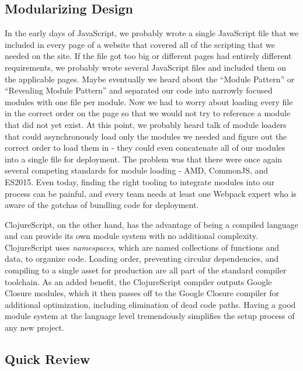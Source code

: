 \documentclass[10pt,twoside,openright]{memoir}
\begin{document}
\subsection{Modularizing Design}

In the early days of JavaScript, we probably wrote a single JavaScript
file that we included in every page of a website that covered all of the
scripting that we needed on the site. If the file got too big or
different pages had entirely different requirements, we probably wrote
several JavaScript files and included them on the applicable pages.
Maybe eventually we heard about the ``Module Pattern'' or ``Revealing
Module Pattern'' and separated our code into narrowly focused modules
with one file per module. Now we had to worry about loading every file
in the correct order on the page so that we would not try to reference a
module that did not yet exist. At this point, we probably heard talk of
module loaders that could asynchronously load only the modules we needed
and figure out the correct order to load them in - they could even
concatenate all of our modules into a single file for deployment. The
problem was that there were once again several competing standards for
module loading - AMD, CommonJS, and ES2015. Even today, finding the
right tooling to integrate modules into our process can be painful, and
every team needs at least one Webpack expert who is aware of the gotchas
of bundling code for deployment.

ClojureScript, on the other hand, has the advantage of being a compiled
language and can provide its own module system with no additional
complexity. ClojureScript uses \emph{namespaces}, which are named
collections of functions and data, to organize code. Loading order,
preventing circular dependencies, and compiling to a single asset for
production are all part of the standard compiler toolchain. As an added
benefit, the ClojureScript compiler outputs Google Closure modules,
which it then passes off to the Google Closure compiler for additional
optimization, including elimination of dead code paths. Having a good
module system at the language level tremendously simplifies the setup
process of any new project.

\subsection{Quick Review}
\end{document}
